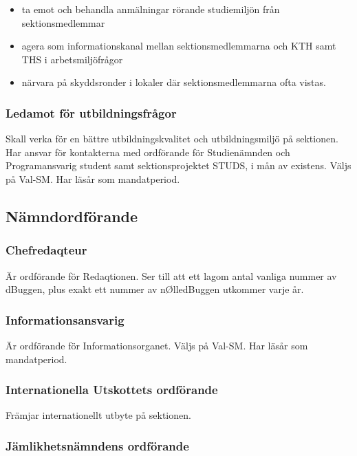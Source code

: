 \documentclass[a4paper,12pt]{article}
\begin{document}
\begin{itemize}
  \item ta emot och behandla anmälningar rörande studiemiljön från sektionsmedlemmar
  \item agera som informationskanal mellan sektionsmedlemmarna och KTH samt THS i arbetsmiljöfrågor
  \item närvara på skyddsronder i lokaler där sektionsmedlemmarna ofta vistas.
\end{itemize}

\subsubsection{Ledamot för utbildningsfrågor}

Skall verka för en bättre utbildningskvalitet och utbildningsmiljö på sektionen. Har ansvar för kontakterna med ordförande för Studienämnden och Programansvarig student samt sektionsprojektet STUDS, i mån av existens. Väljs på Val-SM. Har läsår som mandatperiod.

\subsection{Nämndordförande}

\subsubsection{Chefredaqteur}

Är ordförande för Redaqtionen. Ser till att ett lagom antal vanliga nummer av dBuggen, plus exakt ett nummer av nØlledBuggen utkommer varje år.

\subsubsection{Informationsansvarig}

Är ordförande för Informationsorganet. Väljs på Val-SM. Har läsår som mandatperiod.

\subsubsection{Internationella Utskottets ordförande}

Främjar internationellt utbyte på sektionen.

\subsubsection{Jämlikhetsnämndens ordförande}
\end{document}
